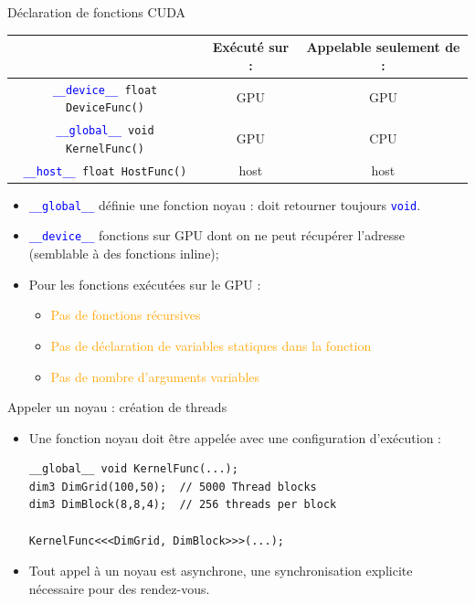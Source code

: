 \documentclass[handout,francais]{beamer}
\begin{document}
\begin{frame}{Déclaration de fonctions CUDA}

  \begin{tabular}{|c|c|c|}\hline
 & \begin{minipage}{2cm}\small Exécuté sur :\end{minipage} & 
 \begin{minipage}{2cm}\small Appelable seulement de :\end{minipage} \\ \hline \hline
\texttt{\textcolor{blue}{\_\_device\_\_} float DeviceFunc()} &
GPU & GPU \\ \hline
\texttt{\textcolor{blue}{\_\_global\_\_} void KernelFunc()} &
GPU & CPU \\ \hline
\texttt{\textcolor{blue}{\_\_host\_\_} float HostFunc()} & host & host \\
\hline
\end{tabular}

\begin{itemize}
\item \texttt{\textcolor{blue}{\_\_global\_\_}} définie une fonction noyau :
doit retourner toujours \textcolor{blue}{\tt void}.
\item \textcolor{blue}{\tt \_\_device\_\_} fonctions sur GPU dont on ne peut
récupérer l'adresse (semblable à des fonctions inline);
\item Pour les fonctions exécutées sur le GPU :
  \begin{itemize}
  \item \textcolor{orange}{Pas de fonctions récursives}
  \item \textcolor{orange}{Pas de déclaration de variables statiques dans la fonction}
  \item \textcolor{orange}{Pas de nombre d'arguments variables}
  \end{itemize}
\end{itemize}
\end{frame}

\begin{frame}[containsverbatim]{Appeler un noyau : création de threads}

\begin{itemize}
\item Une fonction noyau doit être appelée avec une configuration d'exécution :
\begin{lstlisting}
__global__ void KernelFunc(...);
dim3 DimGrid(100,50);  // 5000 Thread blocks
dim3 DimBlock(8,8,4);  // 256 threads per block

KernelFunc<<<DimGrid, DimBlock>>>(...);
\end{lstlisting}
\item Tout appel à un noyau est asynchrone, une synchronisation
  explicite nécessaire pour des rendez-vous.
\end{itemize}
\end{frame}
\end{document}
